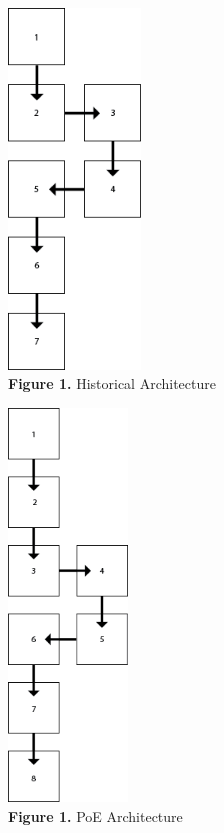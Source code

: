 \documentclass{article}
\begin{document}
\begin{multicols}{2}
\begin{center}
\includegraphics[width=100pt] {archHist.png}\\
\vspace{4mm}
\vfill
\textbf{Figure 1.}  Historical Architecture
\end{center}

\columnbreak

\begin{center}
\includegraphics[width=90pt] {archPoE.png}\\
\vspace{4mm}
\vfill
\textbf{Figure 1.} PoE Architecture
\end{center}

\end{multicols}
\end{document}

